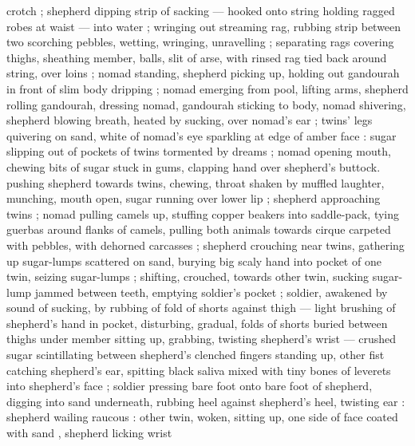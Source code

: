 crotch ; shepherd dipping strip of sacking --- hooked onto string holding ragged robes at waist --- into water ; wringing out streaming rag, rubbing strip between two scorching pebbles, wetting, wringing, unravelling ; separating rags covering thighs, sheathing member, balls, slit of arse, with rinsed rag tied back around string, over loins ; nomad standing, shepherd picking up, holding out gandourah in front of slim body dripping ; nomad emerging from pool, lifting arms, shepherd rolling gandourah, dressing nomad, gandourah sticking to body, nomad shivering, shepherd blowing breath, heated by sucking, over nomad's ear ; twins' legs quivering on sand, white of nomad's eye sparkling at edge of amber face : sugar slipping out of pockets of twins tormented by dreams ; nomad opening mouth, chewing bits of sugar stuck in gums, clapping hand over shepherd's buttock.  pushing shepherd towards twins, chewing, throat shaken by muffled laughter, munching, mouth open, sugar running over lower lip ; shepherd approaching twins ; nomad pulling camels up, stuffing copper beakers into saddle-pack, tying guerbas around flanks of camels, pulling both animals towards cirque carpeted with pebbles, with dehorned carcasses ; shepherd crouching near twins, gathering up sugar-lumps scattered on sand, burying big scaly hand into pocket of one twin, seizing sugar-lumps ; shifting, crouched, towards other twin, sucking sugar-lump jammed between teeth, emptying soldier's pocket ; soldier, awakened by sound of sucking, by rubbing of fold of shorts against thigh --- light brushing of shepherd's hand in pocket, disturbing, gradual, folds of shorts buried between thighs under member {\dashcom} sitting up, grabbing, twisting shepherd's wrist --- crushed sugar scintillating between shepherd's clenched fingers {\dashcom} standing up, other fist catching shepherd's ear, spitting black saliva mixed with tiny bones of leverets into shepherd's face{\td}  ; soldier pressing bare foot onto bare foot of shepherd, digging into sand underneath, rubbing heel against shepherd's heel, twisting ear : shepherd wailing raucous : other twin, woken, sitting up, one side of face coated with sand{\td} , shepherd licking wrist 

